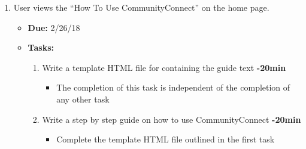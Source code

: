 \documentclass[12pt]{article}
\begin{document}
  \begin{enumerate}
    \item User views the “How To Use CommunityConnect” on the home page.
      \begin{itemize}
        \item \textbf{Due:} 2/26/18
        \item \textbf{Tasks:}
          \begin{enumerate}
            \item Write a template HTML file for containing the guide text \textbf{-20min}
              \begin{itemize}
                \item The completion of this task is independent of the completion of any other task
              \end{itemize}
            \item  Write a step by step guide on how to use CommunityConnect \textbf{-20min}
              \begin{itemize}
                \item Complete the template HTML file outlined in the first task
              \end{itemize}
          \end{enumerate}
      \end{itemize}


\end{enumerate}
\end{document}
